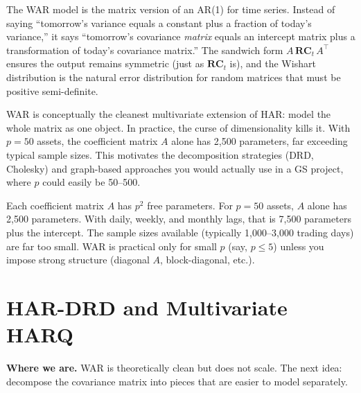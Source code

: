 \begin{intuition}
The WAR model is the matrix version of an AR(1) for time series. Instead of
saying ``tomorrow's variance equals a constant plus a fraction of today's
variance,'' it says ``tomorrow's covariance \emph{matrix} equals an intercept
matrix plus a transformation of today's covariance matrix.'' The sandwich
form $A\,\mathbf{RC}_t\,A^\top$ ensures the output remains symmetric (just as
$\mathbf{RC}_t$ is), and the Wishart distribution is the natural error
distribution for random matrices that must be positive semi-definite.
\end{intuition}

\begin{projectconnection}
WAR is conceptually the cleanest multivariate extension of HAR: model the
whole matrix as one object. In practice, the curse of dimensionality kills it.
With $p = 50$ assets, the coefficient matrix $A$ alone has 2{,}500 parameters,
far exceeding typical sample sizes. This motivates the decomposition strategies
(DRD, Cholesky) and graph-based approaches you would actually use in a GS
project, where $p$ could easily be 50--500.
\end{projectconnection}

\begin{warning}
Each coefficient matrix $A$ has $p^2$ free parameters. For $p = 50$ assets,
$A$ alone has 2{,}500 parameters. With daily, weekly, and monthly lags, that
is 7{,}500 parameters plus the intercept. The sample sizes available
(typically 1{,}000--3{,}000 trading days) are far too small. WAR is practical
only for small $p$ (say, $p \leq 5$) unless you impose strong structure
(diagonal $A$, block-diagonal, etc.).
\end{warning}


\section{HAR-DRD and Multivariate HARQ}\label{sec:multivariate:drd}

\textbf{Where we are.}  WAR is theoretically clean but does not scale. The next
idea: decompose the covariance matrix into pieces that are easier to model
separately.

